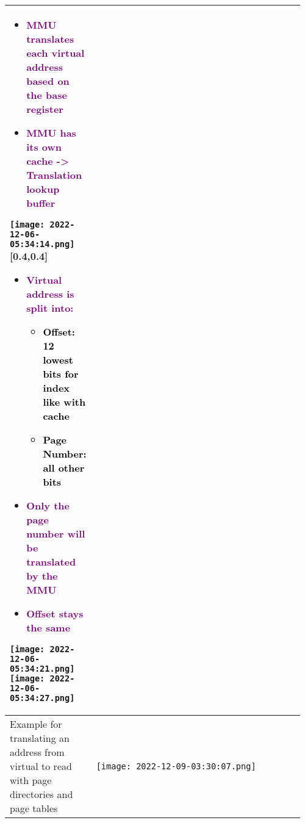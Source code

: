 \documentclass[main.tex,fontsize=8pt,paper=a4,paper=portrait,DIV=calc,]{scrartcl}
\begin{document}
\begin{table}[ht!]
\begin{tabular}{|m{0.2\linewidth}|m{0.755\linewidth}|}
{\begin{itemize}
\item \textcolor{purple}{MMU translates each virtual address based on the base register}
\item \textcolor{purple}{MMU has its own cache -> Translation lookup buffer}
\end{itemize} 
}{
\texttt{[image: 2022-12-06-05:34:14.png]}\newline
}[0.4,0.4] \newline 
\begin{itemize}
\item \textcolor{purple}{Virtual address is split into:}\newline
  \begin{itemize}
  \item \textcolor{black}{Offset: 12 lowest bits for index like with cache}
  \item \textcolor{black}{Page Number: all other bits}
  \end{itemize} 
\item \textcolor{purple}{Only the page number will be translated by the MMU}
\item \textcolor{purple}{Offset stays the same}
\end{itemize}
\texttt{[image: 2022-12-06-05:34:21.png]} 
\texttt{[image: 2022-12-06-05:34:27.png]}\\
\hline
Example for translating an address from virtual to read with page directories and page tables &
\vspace{2mm}
\texttt{[image: 2022-12-09-03:30:07.png]}\\
\hline
\end{tabular}
\end{table}
\pagebreak
\end{document}
